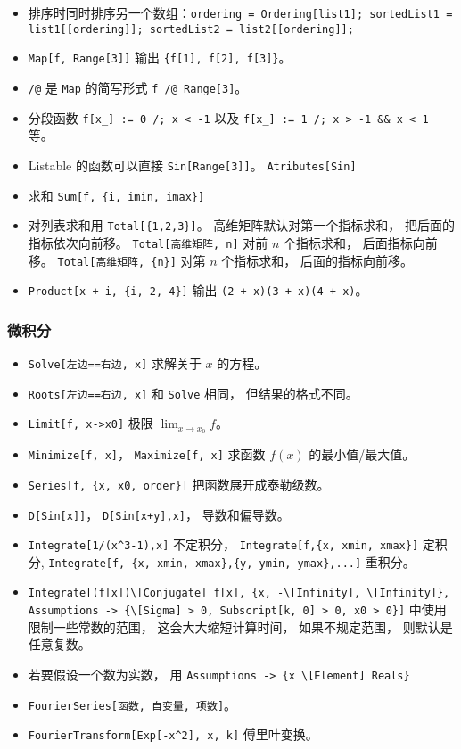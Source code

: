 \begin{itemize}
\item 排序时同时排序另一个数组：\verb`ordering = Ordering[list1]; sortedList1 = list1[[ordering]]; sortedList2 = list2[[ordering]];`
\item \verb`Map[f, Range[3]]` 输出 \verb`{f[1], f[2], f[3]}`。
\item \verb`/@` 是 \verb`Map` 的简写形式 \verb`f /@ Range[3]`。
\item 分段函数 \verb`f[x_] := 0 /; x < -1` 以及 \verb`f[x_] := 1 /; x > -1 && x < 1` 等。
\item Listable 的函数可以直接 \verb`Sin[Range[3]]`。 \verb`Atributes[Sin]`
\item 求和 \verb`Sum[f, {i, imin, imax}]`
\item 对列表求和用 \verb`Total[{1,2,3}]`。 高维矩阵默认对第一个指标求和， 把后面的指标依次向前移。 \verb`Total[高维矩阵, n]` 对前 $n$ 个指标求和， 后面指标向前移。 \verb`Total[高维矩阵, {n}]` 对第 $n$ 个指标求和， 后面的指标向前移。
\item \verb`Product[x + i, {i, 2, 4}]` 输出 \verb`(2 + x)(3 + x)(4 + x)`。
\end{itemize}

\subsubsection{微积分}
\begin{itemize}
\item \verb`Solve[左边==右边, x]` 求解关于 $x$ 的方程。
\item \verb`Roots[左边==右边, x]` 和 \verb`Solve` 相同， 但结果的格式不同。
\item \verb`Limit[f, x->x0]` 极限 $\lim_{x\to x_0} f$。
\item \verb`Minimize[f, x]`， \verb`Maximize[f, x]` 求函数 $f(x)$ 的最小值/最大值。
\item \verb`Series[f, {x, x0, order}]` 把函数展开成泰勒级数。
\item \verb`D[Sin[x]]`， \verb`D[Sin[x+y],x]`， 导数和偏导数。
\item \verb`Integrate[1/(x^3-1),x]` 不定积分， \verb`Integrate[f,{x, xmin, xmax}]` 定积分, \verb`Integrate[f, {x, xmin, xmax},{y, ymin, ymax},...]` 重积分。
\item \verb`Integrate[(f[x])\[Conjugate] f[x], {x, -\[Infinity], \[Infinity]}, Assumptions -> {\[Sigma] > 0, Subscript[k, 0] > 0, x0 > 0}]` 中使用限制一些常数的范围， 这会大大缩短计算时间， 如果不规定范围， 则默认是任意复数。
\item 若要假设一个数为实数， 用 \verb`Assumptions -> {x \[Element] Reals}`
\item \verb`FourierSeries[函数, 自变量, 项数]`。
\item \verb`FourierTransform[Exp[-x^2], x, k]` 傅里叶变换。
\end{itemize}

